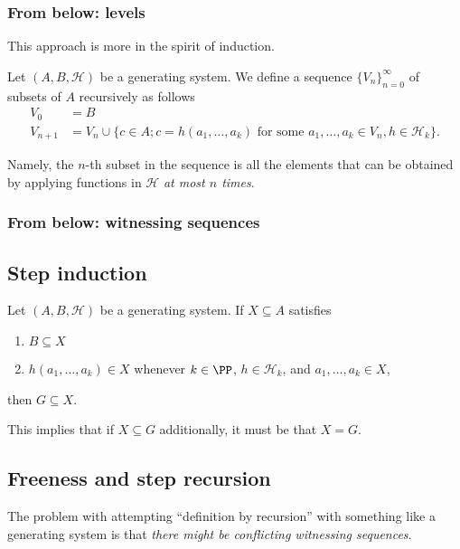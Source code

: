 \documentclass{article}
\begin{document}
\subsubsection*{From below: levels}
    
This approach is more in the spirit of induction.

\begin{definition}
    Let $(A, B, \mathcal{H})$ be a generating system.
    We define a sequence $\{V_n\}_{n=0}^\infty$ of subsets of $A$ recursively as follows
    \begin{align*}
        V_0 &= B \\
        V_{n+1} &= V_n \cup \{c\in A; c = h(a_1,\ldots,a_k) \text{ for some } a_1,\ldots,a_k \in V_n, h \in \mathcal{H}_k\}.
    \end{align*}
\end{definition}

Namely, the $n$-th subset in the sequence is all the elements that can be obtained by applying functions in $\mathcal{H}$ \textit{at most $n$ times}.

\subsubsection*{From below: witnessing sequences}

\subsection{Step induction}

\begin{definition}
    Let $(A, B, \mathcal{H})$ be a generating system.
    If $X \subseteq A$ satisfies
    \begin{enumerate}[label=(\roman*)]
        \item $B \subseteq X$
        \item $h(a_1,\ldots,a_k) \in X$ whenever $k \in \PP$, $h \in \mathcal{H}_k$, and $a_1,\ldots,a_k \in X$,
    \end{enumerate}
    then $G \subseteq X$.
\end{definition}

This implies that if $X \subseteq G$ additionally, it must be that $X = G$.


\subsection{Freeness and step recursion}

The problem with attempting ``definition by recursion'' with something like a generating system is that \textit{there might be conflicting witnessing sequences}.
\end{document}
